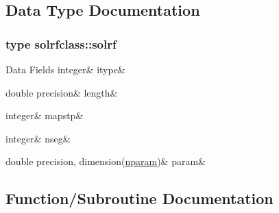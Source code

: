 \subsection{Data Type Documentation}
\label{structsolrfclass_1_1solrf}
\subsubsection{type solrfclass\+::solrf}
\begin{DoxyFields}{Data Fields}
\mbox{\label{namespacesolrfclass_af3ec222ea47a2e9d6dea703d94927750}} 
integer&
itype&
\\
\hline

\mbox{\label{namespacesolrfclass_a6fbb4ce6f8918840cadf9ee8e16769f9}} 
double precision&
length&
\\
\hline

\mbox{\label{namespacesolrfclass_af5533539dedb70fb85e93b1a76a7a55d}} 
integer&
mapstp&
\\
\hline

\mbox{\label{namespacesolrfclass_a1825472ba9b6dfe1d7ca72bfc85f0532}} 
integer&
nseg&
\\
\hline

\mbox{\label{namespacesolrfclass_a10deafd1e7cbd79c86c62766f73105f9}} 
double precision, dimension(\mbox{\hyperlink{namespacesolrfclass_a01b965e25069cff9fb1797fbbcb9939d}{nparam}})&
param&
\\
\hline

\end{DoxyFields}


\subsection{Function/\+Subroutine Documentation}
\mbox{\label{namespacesolrfclass_a3d7deb451633bf4e6fc42e0b43f21e2e}} 
